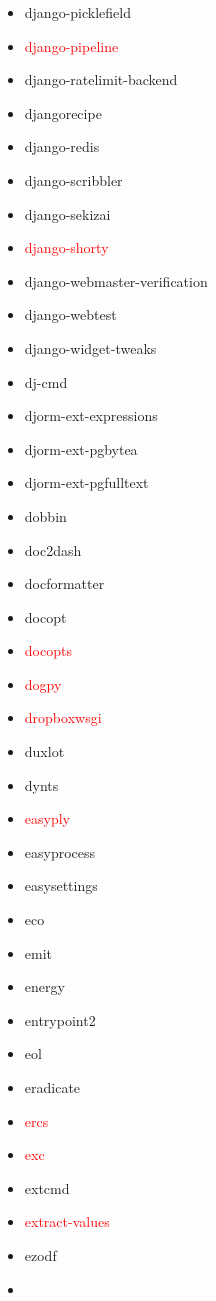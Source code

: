 \documentclass{l4proj}
\begin{document}
\begin{appendices}
{\begin{itemize}
\item django-picklefield
\item\textcolor{red}{django-pipeline}
\item django-ratelimit-backend
\item djangorecipe
\item django-redis
\item django-scribbler
\item django-sekizai
\item\textcolor{red}{django-shorty}
\item django-webmaster-verification
\item django-webtest
\item django-widget-tweaks
\item dj-cmd
\item djorm-ext-expressions
\item djorm-ext-pgbytea
\item djorm-ext-pgfulltext
\item dobbin
\item doc2dash
\item docformatter
\item docopt
\item\textcolor{red}{docopts}
\item\textcolor{red}{dogpy}
\item\textcolor{red}{dropboxwsgi}
\item duxlot
\item dynts
\item\textcolor{red}{easyply}
\item easyprocess
\item easysettings
\item eco
\end{itemize}
}%
\clearpage
\noindent\parbox[t]{0.32\textwidth}{\raggedright%
\begin{itemize}
\item emit
\item energy
\item entrypoint2
\item eol
\item eradicate
\item\textcolor{red}{ercs}
\item\textcolor{red}{exc}
\item extcmd
\item\textcolor{red}{extract-values}
\item ezodf
\item\textcolor{red}{}

\end{itemize}}
\end{appendices}
\end{document}
